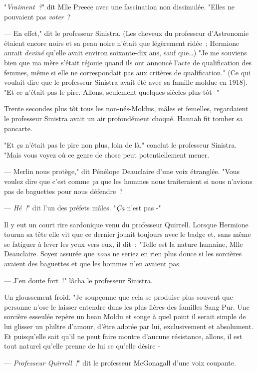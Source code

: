 "\emph{Vraiment~?}" dit Mlle Preece avec une fascination non dissimulée. "Elles ne pouvaient pas \emph{voter}~?

--- En effet," dit le professeur Sinistra. (Les cheveux du professeur d'Astronomie étaient encore noirs et sa peau noire n'était que légèrement ridée~; Hermione aurait \emph{deviné} qu'elle avait environ soixante-dix ans, sauf que…) "Je me souviens bien que ma mère s'était réjouie quand ils ont annoncé l'acte de qualification des femmes, même si elle ne correspondait pas aux critères de qualification." (Ce qui voulait dire que le professeur Sinistra avait été avec sa famille moldue en 1918). "Et ce n'était pas le pire. Allons, seulement quelques siècles plus tôt -"

Trente secondes plus tôt tous les non-nés-Moldus, mâles et femelles, regardaient le professeur Sinistra avait un air profondément choqué. Hannah fit tomber sa pancarte.

"Et \emph{ça} n'était pas le pire non plus, loin de là," conclut le professeur Sinistra. "Mais vous voyez où ce genre de chose peut potentiellement mener.

--- Merlin nous protège," dit Pénélope Deauclaire d'une voix étranglée. "Vous voulez dire que c'est comme \emph{ça} que les hommes nous traiteraient si nous n'avions pas de baguettes pour nous défendre~?

--- \emph{Hé~!}" dit l'un des préfets mâles. "\emph{Ça} n'est pas -"

Il y eut un court rire sardonique venu du professeur Quirrell. Lorsque Hermione tourna sa tête elle vit que ce dernier jouait toujours avec le badge et, sans même se fatiguer à lever les yeux vers eux, il dit~: "Telle est la nature humaine, Mlle Deauclaire. Soyez assurée que \emph{vous} ne seriez en rien plus douce si les sorcières avaient des baguettes et que les hommes n'en avaient pas.

--- J'en doute fort~!" lâcha le professeur Sinistra.

Un gloussement froid. "Je soupçonne que cela se produise plus souvent que personne n'ose le laisser entendre dans les plus fières des familles Sang Pur. Une sorcière esseulée repère un beau Moldu et songe à quel point il serait simple de lui glisser un philtre d'amour, d'être adorée par lui, exclusivement et absolument. Et puisqu'elle sait qu'il ne peut faire montre d'aucune résistance, allons, il est tout naturel qu'elle prenne de lui ce qu'elle désire -

--- \emph{Professeur Quirrell~!}" dit le professeur McGonagall d'une voix coupante.

